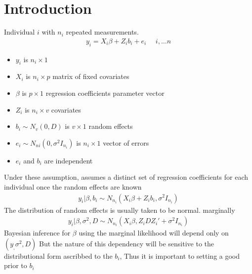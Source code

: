 \documentclass[11pt]{article}
\begin{document}
\section{Introduction}
Individual $i$ with $n_i$ repeated measurements.
\begin{align*}
y_i = X_i \beta + Z_i b_i + e_i \;\;\;\;\ i, \dots n
\end{align*}
\begin{itemize}
	\item $y_i$ is $n_i \times1$
	\item $X_i$ is $n_i \times p$ matrix of fixed covariates
	\item $\beta$ is $p \times1$ regression coefficients parameter vector
	\item $Z_i$ is $n_i \times v$ covariates 
	\item $b_i \sim N_v(0,D)$ is $v \times1$ random effects
	\item $e_i \sim N_{ni}(0,\sigma^2 I_{n_i})$ is $n_i \times1$ vector of errors 
	\item $e_i$ and $b_i$ are independent
\end{itemize}
Under these assumption, assumes a distinct set of regression coefficients for each individual once the random effects are known
\begin{align*}
y_i | \beta,b_i \sim N_{n_i}(X_i \beta + Z_i b_i , \sigma^2 I_{n_i})
\end{align*}
The distribution of random effects is usually taken to be normal. marginally
\begin{align*}
y_i | \beta ,\sigma^2, D \sim N_{n_i}(X_i\beta, Z_iDZ_i' + \sigma^2I_{n_i})
\end{align*}
Bayesian inference for $\beta$ using the marginal likelihood will depend only on$(y_,\sigma^2,D)$ But the nature of this dependency will be sensitive to the distributional form ascribbed to the $b_i$, Thus it is important to setting a good prior to $b_i$
\end{document}
